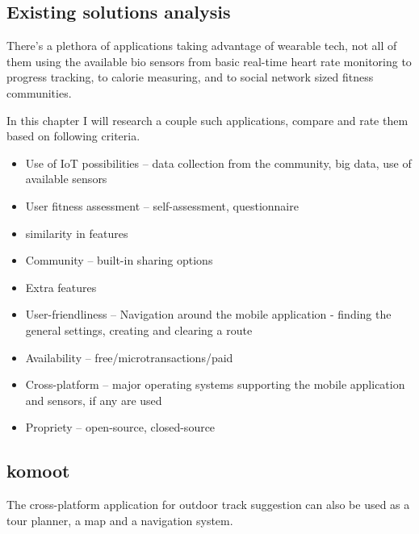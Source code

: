 
\subsection{Existing solutions analysis}
There's a plethora of applications taking advantage of wearable tech, not all of them using the available bio sensors from basic real-time heart rate monitoring to progress tracking, to calorie measuring, and to social network sized fitness communities.

In this chapter I will research a couple  such applications, compare and rate them based on following criteria. 
\begin{itemize}
    \item Use of IoT possibilities -- data collection from the community, big data, use of available sensors
    \item User fitness assessment -- self-assessment, questionnaire
    \item similarity in features 
    \item Community -- built-in sharing options
    \item Extra features
    \item User-friendliness -- Navigation around the mobile application - finding the general settings, creating and clearing a route
    \item Availability -- free/microtransactions/paid
    \item Cross-platform -- major operating systems supporting the mobile application and sensors, if any are used 
    \item Propriety -- open-source, closed-source
\end{itemize}


\subsection{komoot}
The cross-platform application for outdoor track suggestion can also be used as a tour planner, a map and a navigation system.


